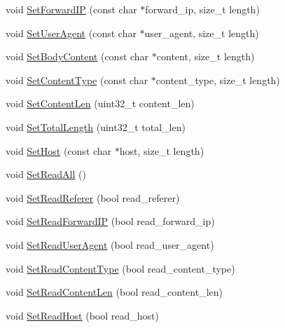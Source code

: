 \begin{DoxyCompactItemize}
\item 
void \hyperlink{class_c_http_parser_wrapper_ab6b8c657b308e2f2ea96643d6f019a12}{Set\+Forward\+I\+P} (const char $\ast$forward\+\_\+ip, size\+\_\+t length)
\item 
void \hyperlink{class_c_http_parser_wrapper_afc6f617343b61a8354e15fa8e6527cd2}{Set\+User\+Agent} (const char $\ast$user\+\_\+agent, size\+\_\+t length)
\item 
void \hyperlink{class_c_http_parser_wrapper_ac9ca2f62addee35a489e671ca72dc558}{Set\+Body\+Content} (const char $\ast$content, size\+\_\+t length)
\item 
void \hyperlink{class_c_http_parser_wrapper_a8d343ccd92e3c3cac6140627b9e0192d}{Set\+Content\+Type} (const char $\ast$content\+\_\+type, size\+\_\+t length)
\item 
void \hyperlink{class_c_http_parser_wrapper_a537c4440f0df4e846ada288e1ae63f2f}{Set\+Content\+Len} (uint32\+\_\+t content\+\_\+len)
\item 
void \hyperlink{class_c_http_parser_wrapper_af3c58761ba5106e516767256393a2ccc}{Set\+Total\+Length} (uint32\+\_\+t total\+\_\+len)
\item 
void \hyperlink{class_c_http_parser_wrapper_a87a8fd914f3277ae88455cf8b1e4fc18}{Set\+Host} (const char $\ast$host, size\+\_\+t length)
\item 
void \hyperlink{class_c_http_parser_wrapper_a915fd9ee3c6e5c6f77289c11d3d515a2}{Set\+Read\+All} ()
\item 
void \hyperlink{class_c_http_parser_wrapper_a5b166ca4ca9a08a68e08da60c621da61}{Set\+Read\+Referer} (bool read\+\_\+referer)
\item 
void \hyperlink{class_c_http_parser_wrapper_a84d8515b2a050124e60ab9597a73a1d3}{Set\+Read\+Forward\+I\+P} (bool read\+\_\+forward\+\_\+ip)
\item 
void \hyperlink{class_c_http_parser_wrapper_a7a82a07a46f5419866f7b481256718ff}{Set\+Read\+User\+Agent} (bool read\+\_\+user\+\_\+agent)
\item 
void \hyperlink{class_c_http_parser_wrapper_a04082b1caf7fbf5e3a2a485416cce725}{Set\+Read\+Content\+Type} (bool read\+\_\+content\+\_\+type)
\item 
void \hyperlink{class_c_http_parser_wrapper_a0fd584cd495d1e80bd577a871ef2614a}{Set\+Read\+Content\+Len} (bool read\+\_\+content\+\_\+len)
\item 
void \hyperlink{class_c_http_parser_wrapper_afec5e1051d9035145213f0cdd56ecddb}{Set\+Read\+Host} (bool read\+\_\+host)
\item 

\end{DoxyCompactItemize}
